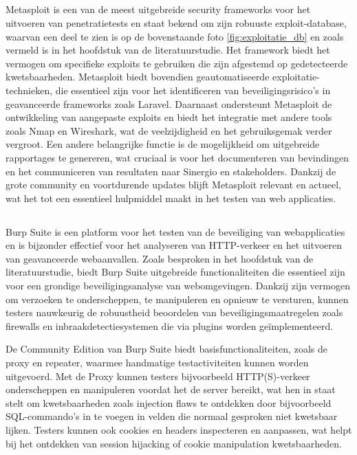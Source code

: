 \subsection{}
Metasploit is een van de meest uitgebreide security frameworks voor het uitvoeren van penetratietests en staat bekend om 
zijn robuuste exploit-database, waarvan een deel te zien is op de bovenstaande foto \ref{fig:exploitatie_db} en zoals vermeld is in het hoofdstuk  van de 
literatuurstudie. Het framework biedt het vermogen om specifieke exploits te gebruiken die zijn afgestemd op gedetecteerde 
kwetsbaarheden. Metasploit biedt bovendien geautomatiseerde exploitatie-technieken, die essentieel zijn voor het identificeren 
van beveiligingsrisico's in geavanceerde frameworks zoals Laravel. Daarnaast ondersteunt Metasploit de ontwikkeling van 
aangepaste exploits en biedt het integratie met andere tools zoals Nmap en Wireshark, wat de veelzijdigheid en het 
gebruiksgemak verder vergroot. Een andere belangrijke functie is de mogelijkheid om uitgebreide rapportages te genereren, 
wat cruciaal is voor het documenteren van bevindingen en het communiceren van resultaten naar Sinergio en stakeholders. Dankzij de grote 
community en voortdurende updates blijft Metasploit relevant en actueel, wat het tot een essentieel hulpmiddel maakt in het 
testen van web applicaties.

\subsection{}
Burp Suite is een platform voor het testen van de beveiliging van webapplicaties en is bijzonder effectief voor 
het analyseren van HTTP-verkeer en het uitvoeren van geavanceerde webaanvallen. Zoals besproken in het hoofdstuk  
van de literatuurstudie, biedt Burp Suite uitgebreide functionaliteiten die essentieel zijn voor een grondige beveiligingsanalyse 
van webomgevingen. Dankzij zijn vermogen om verzoeken te onderscheppen, te manipuleren en opnieuw te versturen, kunnen 
testers nauwkeurig de robuustheid beoordelen van beveiligingsmaatregelen zoals firewalls en inbraakdetectiesystemen die via 
plugins worden geïmplementeerd. 

De Community Edition van Burp Suite biedt basisfunctionaliteiten, zoals de proxy en repeater, 
waarmee handmatige testactiviteiten kunnen worden uitgevoerd. Met de Proxy kunnen testers bijvoorbeeld HTTP(S)-verkeer 
onderscheppen en manipuleren voordat het de server bereikt, wat hen in staat stelt om kwetsbaarheden zoals injection flaws 
te ontdekken door bijvoorbeeld SQL-commando's in te voegen in velden die normaal gesproken niet kwetsbaar lijken. Testers 
kunnen ook cookies en headers inspecteren en aanpassen, wat helpt bij het ontdekken van session hijacking of cookie 
manipulation kwetsbaarheden.

